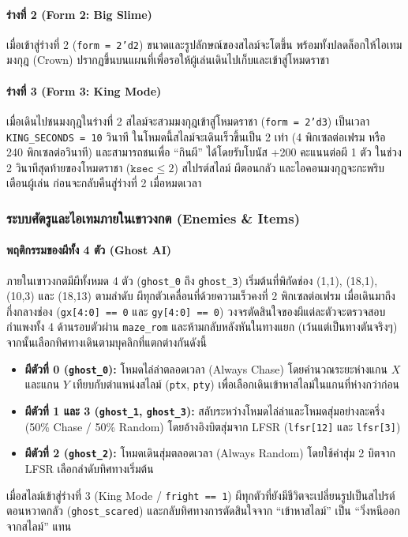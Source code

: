\documentclass[12pt,a4paper]{article}
\begin{document}
\paragraph{ร่างที่ 2 (Form 2: Big Slime)}
เมื่อเข้าสู่ร่างที่ 2 (\texttt{form = 2'd2}) ขนาดและรูปลักษณ์ของสไลม์จะโตขึ้น พร้อมทั้งปลดล็อกให้ไอเทมมงกุฎ (Crown) ปรากฏขึ้นบนแผนที่เพื่อรอให้ผู้เล่นเดินไปเก็บและเข้าสู่โหมดราชา

\paragraph{ร่างที่ 3 (Form 3: King Mode)}
เมื่อเดินไปชนมงกุฎในร่างที่ 2 สไลม์จะสวมมงกุฎเข้าสู่โหมดราชา (\texttt{form = 2'd3}) เป็นเวลา \texttt{KING\_SECONDS = 10} วินาที ในโหมดนี้สไลม์จะเดินเร็วขึ้นเป็น 2 เท่า (4 พิกเซลต่อเฟรม หรือ 240 พิกเซลต่อวินาที) และสามารถชนเพื่อ ``กินผี'' ได้โดยรับโบนัส +200 คะแนนต่อผี 1 ตัว ในช่วง 2 วินาทีสุดท้ายของโหมดราชา ($\texttt{ksec} \le 2$) สไปรต์สไลม์ ผีตอนกลัว และไอคอนมงกุฎจะกะพริบเตือนผู้เล่น ก่อนจะกลับคืนสู่ร่างที่ 2 เมื่อหมดเวลา

\subsubsection{ระบบศัตรูและไอเทมภายในเขาวงกต (Enemies \& Items)}

\paragraph{พฤติกรรมของผีทั้ง 4 ตัว (Ghost AI)}
ภายในเขาวงกตมีผีทั้งหมด 4 ตัว (\texttt{ghost\_0} ถึง \texttt{ghost\_3}) เริ่มต้นที่พิกัดช่อง (1,1), (18,1), (10,3) และ (18,13) ตามลำดับ ผีทุกตัวเคลื่อนที่ด้วยความเร็วคงที่ 2 พิกเซลต่อเฟรม เมื่อเดินมาถึงกึ่งกลางช่อง (\texttt{gx[4:0] == 0} และ \texttt{gy[4:0] == 0}) วงจรตัดสินใจของผีแต่ละตัวจะตรวจสอบกำแพงทั้ง 4 ด้านรอบตัวผ่าน \texttt{maze\_rom} และห้ามกลับหลังหันในทางแยก (เว้นแต่เป็นทางตันจริงๆ) จากนั้นเลือกทิศทางเดินตามบุคลิกที่แตกต่างกันดังนี้
\begin{itemize}[leftmargin=1.5cm]
    \item \textbf{ผีตัวที่ 0 (\texttt{ghost\_0}):} โหมดไล่ล่าตลอดเวลา (Always Chase) โดยคำนวณระยะห่างแกน $X$ และแกน $Y$ เทียบกับตำแหน่งสไลม์ (\texttt{ptx}, \texttt{pty}) เพื่อเลือกเดินเข้าหาสไลม์ในแกนที่ห่างกว่าก่อน
    \item \textbf{ผีตัวที่ 1 และ 3 (\texttt{ghost\_1}, \texttt{ghost\_3}):} สลับระหว่างโหมดไล่ล่าและโหมดสุ่มอย่างละครึ่ง (50\% Chase / 50\% Random) โดยอ้างอิงบิตสุ่มจาก LFSR (\texttt{lfsr[12]} และ \texttt{lfsr[3]})
    \item \textbf{ผีตัวที่ 2 (\texttt{ghost\_2}):} โหมดเดินสุ่มตลอดเวลา (Always Random) โดยใช้ค่าสุ่ม 2 บิตจาก LFSR เลือกลำดับทิศทางเริ่มต้น
\end{itemize}
เมื่อสไลม์เข้าสู่ร่างที่ 3 (King Mode / \texttt{fright == 1}) ผีทุกตัวที่ยังมีชีวิตจะเปลี่ยนรูปเป็นสไปรต์ตอนหวาดกลัว (\texttt{ghost\_scared}) และกลับทิศทางการตัดสินใจจาก ``เข้าหาสไลม์'' เป็น ``วิ่งหนีออกจากสไลม์'' แทน
\end{document}
